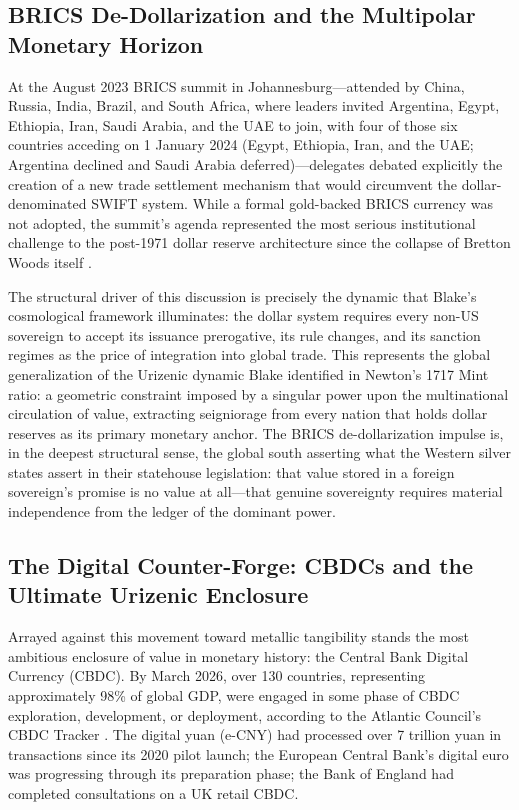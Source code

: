 \documentclass[
]{article}
\begin{document}
\subsection{BRICS De-Dollarization and the Multipolar Monetary
Horizon}\label{brics-de-dollarization-and-the-multipolar-monetary-horizon}

At the August 2023 BRICS summit in Johannesburg---attended by China,
Russia, India, Brazil, and South Africa, where leaders invited
Argentina, Egypt, Ethiopia, Iran, Saudi Arabia, and the UAE to join,
with four of those six countries acceding on 1 January 2024 (Egypt,
Ethiopia, Iran, and the UAE; Argentina declined and Saudi Arabia
deferred)---delegates debated explicitly the creation of a new trade
settlement mechanism that would circumvent the dollar-denominated SWIFT
system. While a formal gold-backed BRICS currency was not adopted, the
summit's agenda represented the most serious institutional challenge to
the post-1971 dollar reserve architecture since the collapse of Bretton
Woods itself \citep{eichengreen2019globalizing}.

The structural driver of this discussion is precisely the dynamic that
Blake's cosmological framework illuminates: the dollar system requires
every non-US sovereign to accept its issuance prerogative, its rule
changes, and its sanction regimes as the price of integration into
global trade. This represents the global generalization of the Urizenic
dynamic Blake identified in Newton's 1717 Mint ratio: a geometric
constraint imposed by a singular power upon the multinational
circulation of value, extracting seigniorage from every nation that
holds dollar reserves as its primary monetary anchor. The BRICS
de-dollarization impulse is, in the deepest structural sense, the global
south asserting what the Western silver states assert in their
statehouse legislation: that value stored in a foreign sovereign's
promise is no value at all---that genuine sovereignty requires material
independence from the ledger of the dominant power.

\subsection{The Digital Counter-Forge: CBDCs and the Ultimate Urizenic
Enclosure}\label{the-digital-counter-forge-cbdcs-and-the-ultimate-urizenic-enclosure}

Arrayed against this movement toward metallic tangibility stands the
most ambitious enclosure of value in monetary history: the Central Bank
Digital Currency (CBDC). By March 2026, over 130 countries, representing
approximately 98\% of global GDP, were engaged in some phase of CBDC
exploration, development, or deployment, according to the Atlantic
Council's CBDC Tracker \citep{atlanticcouncil2026cbdc}. The digital yuan
(e-CNY) had processed over 7 trillion yuan in transactions since its
2020 pilot launch; the European Central Bank's digital euro was
progressing through its preparation phase; the Bank of England had
completed consultations on a UK retail CBDC.
\end{document}
